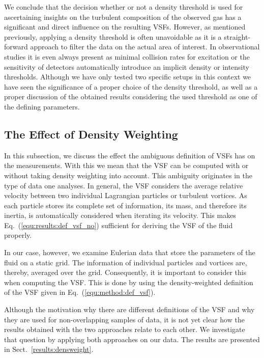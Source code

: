 We conclude that the decision whether or not a density threshold is used for ascertaining insights on the turbulent composition of the observed gas has a significant and direct influence on the resulting VSFs.
However, as mentioned previously, applying a density threshold is often unavoidable as it is a straight-forward approach to filter the data on the actual area of interest.
In observational studies it is even always present as minimal collision rates for excitation or the sensitivity of detectors automatically introduce an implicit density or intensity thresholds. 
Although we have only tested two specific setups in this context we have seen the significance of a proper choice of the density threshold, as well as a proper discussion of the obtained results considering the used threshold as one of the defining parameters.



\subsection{The Effect of Density Weighting}\label{discussion:densweight}

In this subsection, we discuss the effect the ambiguous definition of VSFs has on the measurements. 
With this we mean that the VSF can be computed with or without taking density weighting into account.
This ambiguity originates in the type of data one analyses.
In general, the VSF considers the average relative velocity between two individual Lagrangian particles or turbulent vortices.
As each particle stores its complete set of information, its mass, and therefore its inertia, is automatically considered when iterating its velocity.
This makes Eq.~(\ref{equ:results:def_vsf_no}) sufficient for deriving the VSF of the fluid properly.

In our case, however, we examine Eulerian data that store the parameters of the fluid on a static grid. 
The information of individual particles and vortices are, thereby, averaged over the grid.
Consequently, it is important to consider this when computing the VSF.
This is done by using the density-weighted definition of the VSF given in Eq.~(\ref{equ:method:def_vsf}).

Although the motivation why there are different definitions of the VSF and why they are used for non-overlapping samples of data, it is not yet clear how the results obtained with the two approaches relate to each other. 
We investigate that question by applying both approaches on our data.
The results are presented in Sect.~\ref{results:densweight}.

